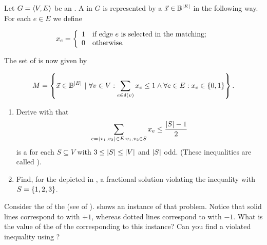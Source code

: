 \begin{exercise}
Let $G=\tupl{V,E}$ be an . A  in $G$ is represented by a  $\vec{x}\in\BoolSet^{\abs{E}}$ in the following way. For each  $e\in E$ we define

\begin{equation}
\semboolvar{x_e}{if edge $e$ is selected in the matching;}{otherwise.}
\end{equation}

The set of  is now given by

\begin{equation}
M=\condset{\vec{x}\in\BoolSet^{|E|}}{\forall v\in V:\sumdomain[e]{\fun{\delta}{v}}{x_e}\leq 1\wedge\forall e\in E:x_e\in\accl{0,1}}.
\end{equation}

\begin{enumerate}
 \item Derive with  that
\begin{equation}
\sumdomain[e=\tupl{v_1,v_2}]{E:v_1,v_2\in S}{x_e}\leq\displaystyle\frac{\abs{S}-1}{2}
\eqnlab{matching-introunding}
\end{equation}
is a  for each $S\subseteq V$ with $3\leq\abs{S}\leq\abs{V}$ and $\abs{S}$ odd. (These inequalities are called ).
 \item Find, for the  depicted in , a fractional solution violating the inequality  with $S=\accl{1,2,3}$.
\end{enumerate}
\end{exercise}
\begin{exercise}
Consider the  of the  (see  of ).  shows an instance of that problem. Notice that solid lines correspond to  with  $+1$, whereas dotted lines correspond to  with  $-1$. What is the value of the  of the  corresponding to this instance? Can you find a violated inequality using ?
\end{exercise}